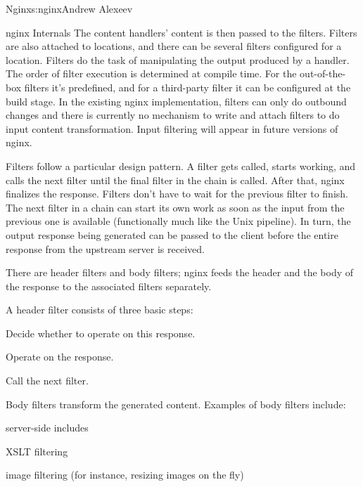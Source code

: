 \begin{aosachapter}{Nginx}{s:nginx}{Andrew Alexeev}
\begin{aosasect1}{nginx Internals}
The content handlers' content is then passed to the filters. Filters
are also attached to locations, and there can be several filters
configured for a location. Filters do the task of manipulating the
output produced by a handler. The order of filter execution is
determined at compile time. For the out-of-the-box filters it's
predefined, and for a third-party filter it can be configured at the
build stage. In the existing nginx implementation, filters can only do
outbound changes and there is currently no mechanism to write and
attach filters to do input content transformation. Input filtering
will appear in future versions of nginx.

Filters follow a particular design pattern. A filter gets called,
starts working, and calls the next filter until the final filter in
the chain is called. After that, nginx finalizes the response. Filters
don't have to wait for the previous filter to finish. The next filter
in a chain can start its own work as soon as the input from the
previous one is available (functionally much like the Unix
pipeline). In turn, the output response being generated can be passed
to the client before the entire response from the upstream server is
received.

There are header filters and body filters; nginx feeds the header and
the body of the response to the associated filters separately.

A header filter consists of three basic steps:

\begin{aosaenumerate}

\item Decide whether to operate on this response.

\item Operate on the response.

\item Call the next filter.

\end{aosaenumerate}

\noindent Body filters transform the generated content. Examples of body filters
include:

\begin{aosaitemize}

\item server-side includes

\item XSLT filtering

\item image filtering (for instance, resizing images on the fly)


\end{aosaitemize}
\end{aosasect1}
\end{aosachapter}
